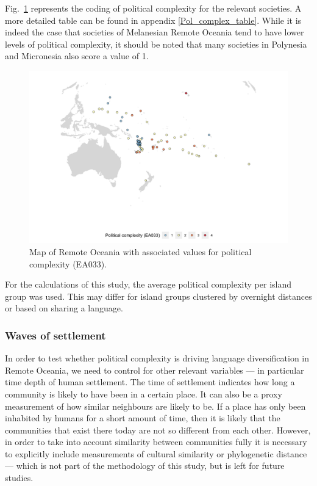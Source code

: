 \documentclass[a4paper,10pt]{article} %
\begin{document}
Fig.~\ref{pol_complex_map} represents the coding of political complexity for the relevant societies. A more detailed table can be found in appendix \ref{Pol_complex_table}. While it is indeed the case that societies of Melanesian Remote Oceania tend to have lower levels of political complexity, it should be noted that many societies in Polynesia and Micronesia also score a value of 1.

\begin{figure}
\centering
\includegraphics[width=19cm]{illustrations/plots_from_R/map_pol_complex.png}
\caption[Map of Remote Oceania: Political complexity]{{Map of Remote Oceania with associated values for political complexity (EA033).}}
\label{pol_complex_map}
\end{figure}

For the calculations of this study, the average political complexity per island group was used. This may differ for island groups clustered by overnight distances or based on sharing a language.


\subsubsection{Waves of settlement}
\label{pol_complex_sec_dates}
In order to test whether political complexity is driving language diversification in Remote Oceania, we need to control for other relevant variables --- in particular time depth of human settlement. The time of settlement indicates how long a community is likely to have been in a certain place. It can also be a proxy measurement of how similar neighbours are likely to be. If a place has only been inhabited by humans for a short amount of time, then it is likely that the communities that exist there today are not so different from each other. However, in order to take into account similarity between communities fully it is necessary to explicitly include measurements of cultural similarity or phylogenetic distance --- which is not part of the methodology of this study, but is left for future studies.
\end{document}
